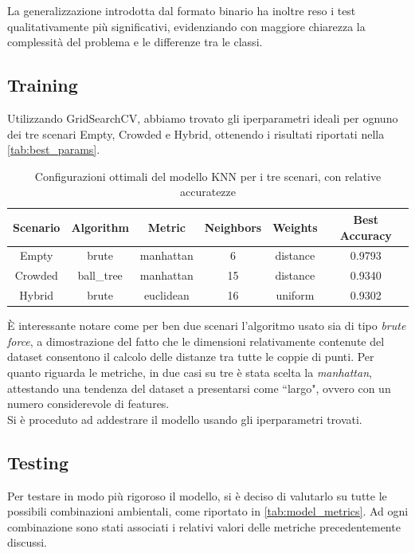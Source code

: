 \documentclass{article}
\begin{document}
La generalizzazione introdotta dal formato binario ha inoltre reso i test qualitativamente più significativi, evidenziando con maggiore chiarezza la complessità del problema e le differenze tra le classi.

\subsection{Training}
Utilizzando GridSearchCV, abbiamo trovato gli iperparametri ideali per ognuno dei tre scenari Empty, Crowded e Hybrid, ottenendo i risultati riportati nella \autoref{tab:best_params}. \\
\begin{table}[ht!]
    \centering
    \begin{tabular}{ c c c c c c}
        \hline
        \textbf{Scenario} & \textbf{Algorithm} & \textbf{Metric} & \textbf{Neighbors} & \textbf{Weights} & \textbf{Best Accuracy} \\
        \hline
        Empty   & brute         & manhattan & 6  & distance & 0.9793  \\
        Crowded & ball\_tree    & manhattan & 15 & distance & 0.9340    \\
        Hybrid  & brute         & euclidean & 16 & uniform  & 0.9302     \\
        \hline
    \end{tabular}
    \caption{Configurazioni ottimali del modello KNN per i tre scenari, con relative accuratezze}
    \label{tab:best_params}
\end{table}

È interessante notare come per ben due scenari l'algoritmo usato sia di tipo \textit{brute force}, a dimostrazione del fatto che le dimensioni relativamente contenute del dataset consentono il calcolo delle distanze tra tutte le coppie di punti. Per quanto riguarda le metriche, in due casi su tre è stata scelta la \textit{manhattan}, attestando una tendenza del dataset a presentarsi come ``largo", ovvero con un numero considerevole di features.\\
Si è proceduto ad addestrare il modello usando gli iperparametri trovati.

\subsection{Testing}
Per testare in modo più rigoroso il modello, si è deciso di valutarlo su tutte le possibili combinazioni ambientali, come riportato in \autoref{tab:model_metrics}.
Ad ogni combinazione sono stati associati i relativi valori delle metriche precedentemente discussi.
\end{document}
